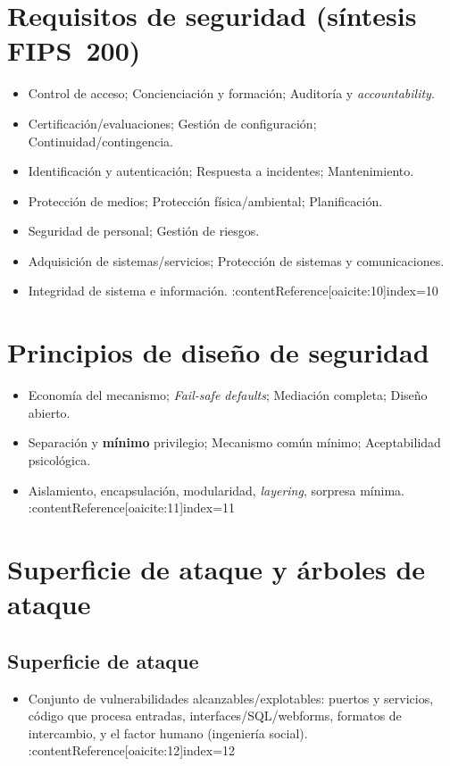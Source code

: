 \documentclass[11pt,a4paper]{article}
\begin{document}
    \section{Requisitos de seguridad (síntesis FIPS~200)}
    \begin{itemize}[leftmargin=1.2em]
        \item Control de acceso; Concienciación y formación; Auditoría y \textit{accountability}.
        \item Certificación/evaluaciones; Gestión de configuración; Continuidad/contingencia.
        \item Identificación y autenticación; Respuesta a incidentes; Mantenimiento.
        \item Protección de medios; Protección física/ambiental; Planificación.
        \item Seguridad de personal; Gestión de riesgos.
        \item Adquisición de sistemas/servicios; Protección de sistemas y comunicaciones.
        \item Integridad de sistema e información. :contentReference[oaicite:10]{index=10}
    \end{itemize}

    \section{Principios de diseño de seguridad}
    \begin{itemize}
        \item Economía del mecanismo; \textit{Fail-safe defaults}; Mediación completa; Diseño abierto.
        \item Separación y \textbf{mínimo} privilegio; Mecanismo común mínimo; Aceptabilidad psicológica.
        \item Aislamiento, encapsulación, modularidad, \textit{layering}, sorpresa mínima. :contentReference[oaicite:11]{index=11}
    \end{itemize}

    \section{Superficie de ataque y árboles de ataque}
    \subsection{Superficie de ataque}
    \begin{itemize}
        \item Conjunto de vulnerabilidades alcanzables/explotables: puertos y servicios, código que procesa entradas, interfaces/SQL/webforms, formatos de intercambio, y el factor humano (ingeniería social). :contentReference[oaicite:12]{index=12}
    \end{itemize}
\end{document}
